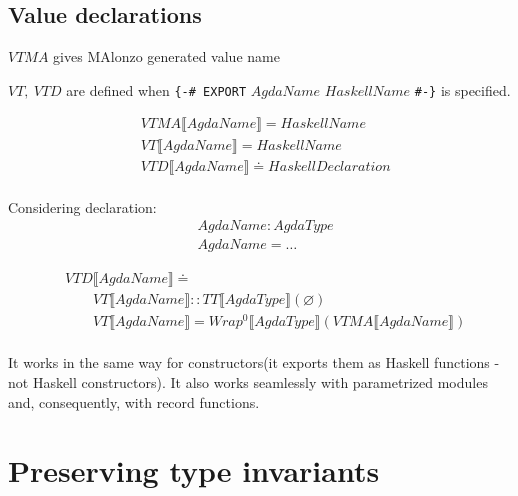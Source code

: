 \subsection{Value declarations}

\(VTMA\) gives MAlonzo generated value name

\(VT,\ VTD\) are defined when \texttt{\{-\# EXPORT} \(AgdaName\) \(HaskellName\) \texttt{\#-\}} is specified.

\begin{align*}
   &VTMA\llbracket AgdaName \rrbracket = HaskellName\\
   &VT\llbracket AgdaName \rrbracket = HaskellName\\
   &VTD\llbracket AgdaName \rrbracket \doteq HaskellDeclaration\\
\end{align*}

Considering declaration:
\begin{align*}
   &AgdaName : AgdaType\\
   &AgdaName = \ldots
\end{align*}

\begin{align*}
   &VTD\llbracket AgdaName \rrbracket \doteq\\
   &\quad\quad VT\llbracket AgdaName \rrbracket :: TT\llbracket AgdaType \rrbracket(\varnothing)\\
   &\quad\quad VT\llbracket AgdaName \rrbracket = Wrap^0\llbracket AgdaType \rrbracket(VTMA\llbracket AgdaName \rrbracket)\\
\end{align*}

It works in the same way for constructors(it exports them as Haskell functions - not Haskell constructors).
It also works seamlessly with parametrized modules and, consequently, with record functions.

\section{Preserving type invariants}

